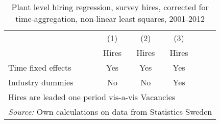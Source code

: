 \begin{table}[htbp]\centering
\def\sym#1{\ifmmode^{#1}\else\(^{#1}\)\fi}
\caption{\label{tab:robust_survey_hires_timeagg_nls} Plant level hiring regression, survey hires, corrected for time-aggregation, non-linear least squares,  2001-2012}
\begin{tabular}{l*{5}{c}}
\hline\hline
                &\multicolumn{1}{c}{(1)}&\multicolumn{1}{c}{(2)}&\multicolumn{1}{c}{(3)}\\
                &\multicolumn{1}{c}{Hires}&\multicolumn{1}{c}{Hires}&\multicolumn{1}{c}{Hires}\\
\hline


\hline 
Time fixed effects  &         Yes         &         Yes         &         Yes                      \\
[1em]
Industry dummies    &          No         &          No         &         Yes               \\
[1em]
\hline 


\hline\hline
\multicolumn{6}{l}{\footnotesize Hires are leaded one period vis-a-vis Vacancies}\\
\multicolumn{6}{l}{\footnotesize \emph{Source:} Own calculations on data from Statistics Sweden}\\
\end{tabular}
\end{table}

